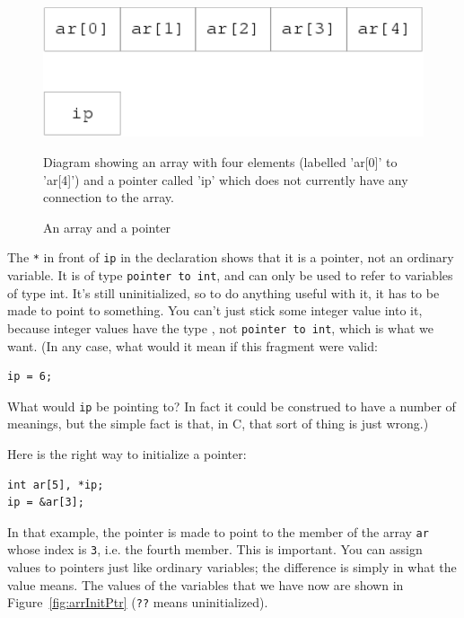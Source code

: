    \begin{figure}[htb]\centering
     \includegraphics[type=pdf,read=.pdf,ext=.pdf,scale=0.9]{figure/5.3_arrPtr}
     \caption*{Diagram showing an array with four elements
       (labelled 'ar[0]' to 'ar[4]') and a pointer called 'ip'
       which does not currently have any connection to the array.}
     \caption{\label{fig:arrPtr}An array and a pointer}
   \end{figure}



   The \texttt{*} in front of \texttt{ip} in the declaration
    shows that it is a pointer, not an ordinary variable. It is of type
    \texttt{pointer to int}, and can only be used to refer to variables
    of type int. It's still uninitialized, so to do anything useful with it,
    it has to be made to point to something. You can't just stick some
    integer value into it, because integer values have the type
    \kint, not \texttt{pointer to int}, which is what we
    want.  (In any case, what would it mean if this fragment were valid:


   \begin{Verbatim}
ip = 6;
\end{Verbatim}

   What would \texttt{ip} be pointing to? In fact it could be
    construed to have a number of meanings, but the simple fact is that, in
    C, that sort of thing is just wrong.)


   Here is the right way to initialize a pointer:


   \begin{Verbatim}
int ar[5], *ip;
ip = &ar[3];
\end{Verbatim}

   In that example, the pointer is made to point to the member of the
    array \texttt{ar} whose index is \texttt{3}, i.e. the fourth
    member. This is important. You can assign values to pointers just like
    ordinary variables; the difference is simply in what the value means.
    The values of the variables that we have now
    are shown in Figure~\ref{fig:arrInitPtr} (\texttt{??} means uninitialized).


